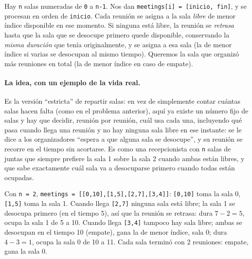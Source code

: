 
Hay \texttt{n} salas numeradas de \texttt{0} a \texttt{n-1}. Nos dan
\texttt{meetings[i] = [inicio, fin]}, y se procesan en orden de
\texttt{inicio}. Cada reunión se asigna a la sala \emph{libre} de menor
índice disponible en ese momento. Si ninguna está libre, la reunión se
\emph{retrasa} hasta que la sala que se desocupe primero quede disponible,
conservando la \emph{misma duración} que tenía originalmente, y se asigna a
esa sala (la de menor índice si varias se desocupan al mismo tiempo).
Queremos la sala que organizó más reuniones en total (la de menor índice en
caso de empate).

\paragraph{La idea, con un ejemplo de la vida real.} Es la versión
``estricta'' de repartir salas: en vez de simplemente contar cuántas salas
hacen falta (como en el problema anterior), aquí ya existe un número fijo
de salas y hay que decidir, reunión por reunión, cuál usa cada una,
incluyendo qué pasa cuando llega una reunión y no hay ninguna sala libre en
ese instante: se le dice a los organizadores ``espera a que alguna sala se
desocupe'', y su reunión se recorre en el tiempo sin acortarse. Es como una
recepcionista con \texttt{n} salas de juntas que siempre prefiere la sala 1
sobre la sala 2 cuando ambas están libres, y que sabe exactamente cuál sala
va a desocuparse primero cuando todas están ocupadas.

\noindent Con \texttt{n = 2}, \texttt{meetings = [[0,10],[1,5],[2,7],[3,4]]}:
\texttt{[0,10]} toma la sala 0, \texttt{[1,5]} toma la sala 1. Cuando llega
\texttt{[2,7]} ninguna sala está libre; la sala 1 se desocupa primero (en el
tiempo 5), así que la reunión se retrasa: dura $7-2=5$, ocupa la sala 1 de
5 a 10. Cuando llega \texttt{[3,4]} tampoco hay sala libre; ambas se
desocupan en el tiempo 10 (empate), gana la de menor índice, sala 0; dura
$4-3=1$, ocupa la sala 0 de 10 a 11. Cada sala terminó con 2 reuniones:
empate, gana la sala 0.

